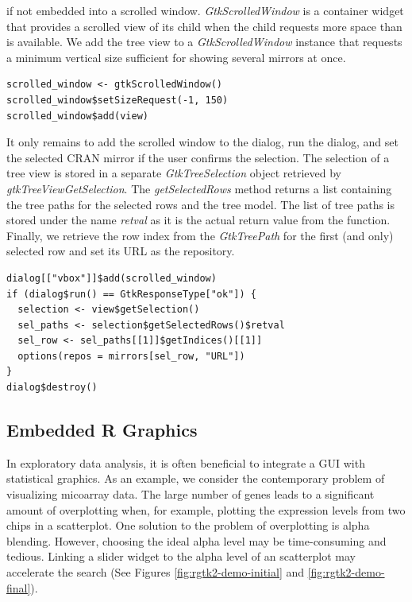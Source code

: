 \documentclass[article]{jss}
\begin{document}
if not embedded into a scrolled window. \emph{GtkScrolledWindow} is a container 
widget that provides a scrolled view of its child when the child requests more
space than is available. We add the tree view to a \emph{GtkScrolledWindow} 
instance that requests a minimum vertical size sufficient for showing several 
mirrors at once.
\begin{verbatim}
scrolled_window <- gtkScrolledWindow()
scrolled_window$setSizeRequest(-1, 150)
scrolled_window$add(view)
\end{verbatim}
It only remains to add the scrolled window to the dialog, run the dialog, and
set the selected CRAN mirror if the user confirms the selection. The selection
of a tree view is stored in a separate \emph{GtkTreeSelection} object retrieved
by \emph{gtkTreeViewGetSelection}. The \emph{getSelectedRows} method returns a 
list containing the tree paths for the selected rows and the tree model. The 
list of tree paths is stored under the name \emph{retval} as it is the actual
return value from the  function. Finally, we retrieve the row index
from the \emph{GtkTreePath} for the first (and only) selected row and set its 
URL as the repository.
\begin{verbatim}
dialog[["vbox"]]$add(scrolled_window)
if (dialog$run() == GtkResponseType["ok"]) {
  selection <- view$getSelection()
  sel_paths <- selection$getSelectedRows()$retval
  sel_row <- sel_paths[[1]]$getIndices()[[1]]
  options(repos = mirrors[sel_row, "URL"])
}
dialog$destroy()
\end{verbatim}

\subsection{Embedded R Graphics}

In exploratory data analysis, it is often beneficial to integrate
a GUI with statistical graphics. As an example, we consider the contemporary
problem of visualizing micoarray data. The large number of genes leads
to a significant amount of overplotting when, for example, plotting
the expression levels from two chips in a scatterplot. One solution
to the problem of overplotting is alpha blending. However, choosing
the ideal alpha level may be time-consuming and tedious. Linking a
slider widget to the alpha level of an  scatterplot may accelerate
the search (See Figures \ref{fig:rgtk2-demo-initial} and \ref{fig:rgtk2-demo-final}). 
\end{document}
